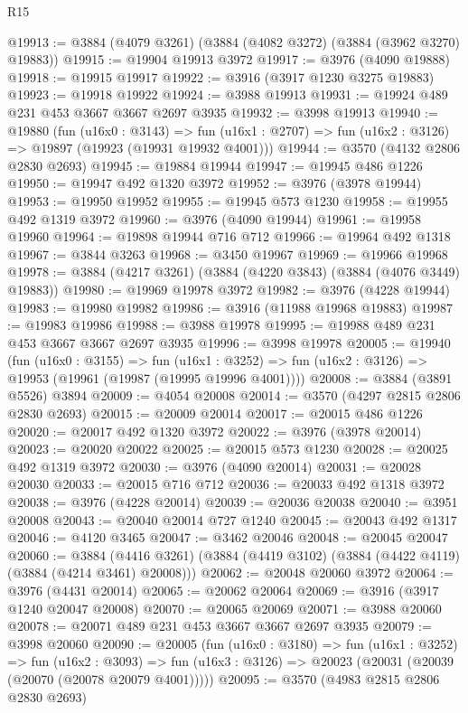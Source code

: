 \begin{lexlean}{R15}
\begin{coremodule}
@19913 := @3884 (@4079 @3261) (@3884 (@4082 @3272) (@3884 (@3962 @3270) @19883))
@19915 := @19904 @19913 @3972
@19917 := @3976 (@4090 @19888)
@19918 := @19915 @19917
@19922 := @3916 (@3917 @1230 @3275 @19883)
@19923 := @19918 @19922
@19924 := @3988 @19913
@19931 := @19924 @489 @231 @453 @3667 @3667 @2697 @3935
@19932 := @3998 @19913
@19940 := @19880
    (fun (u16x0 : @3143) =>
    fun (u16x1 : @2707) => fun (u16x2 : @3126) => @19897 (@19923 (@19931 @19932 @4001)))
@19944 := @3570 (@4132 @2806 @2830 @2693)
@19945 := @19884 @19944
@19947 := @19945 @486 @1226
@19950 := @19947 @492 @1320 @3972
@19952 := @3976 (@3978 @19944)
@19953 := @19950 @19952
@19955 := @19945 @573 @1230
@19958 := @19955 @492 @1319 @3972
@19960 := @3976 (@4090 @19944)
@19961 := @19958 @19960
@19964 := @19898 @19944 @716 @712
@19966 := @19964 @492 @1318
@19967 := @3844 @3263
@19968 := @3450 @19967
@19969 := @19966 @19968
@19978 := @3884 (@4217 @3261) (@3884 (@4220 @3843) (@3884 (@4076 @3449) @19883))
@19980 := @19969 @19978 @3972
@19982 := @3976 (@4228 @19944)
@19983 := @19980 @19982
@19986 := @3916 (@11988 @19968 @19883)
@19987 := @19983 @19986
@19988 := @3988 @19978
@19995 := @19988 @489 @231 @453 @3667 @3667 @2697 @3935
@19996 := @3998 @19978
@20005 := @19940
    (fun (u16x0 : @3155) =>
    fun (u16x1 : @3252) => fun (u16x2 : @3126) => @19953 (@19961 (@19987 (@19995 @19996 @4001))))
@20008 := @3884 (@3891 @5526) @3894
@20009 := @4054 @20008
@20014 := @3570 (@4297 @2815 @2806 @2830 @2693)
@20015 := @20009 @20014
@20017 := @20015 @486 @1226
@20020 := @20017 @492 @1320 @3972
@20022 := @3976 (@3978 @20014)
@20023 := @20020 @20022
@20025 := @20015 @573 @1230
@20028 := @20025 @492 @1319 @3972
@20030 := @3976 (@4090 @20014)
@20031 := @20028 @20030
@20033 := @20015 @716 @712
@20036 := @20033 @492 @1318 @3972
@20038 := @3976 (@4228 @20014)
@20039 := @20036 @20038
@20040 := @3951 @20008
@20043 := @20040 @20014 @727 @1240
@20045 := @20043 @492 @1317
@20046 := @4120 @3465
@20047 := @3462 @20046
@20048 := @20045 @20047
@20060 := @3884
    (@4416 @3261)
    (@3884 (@4419 @3102) (@3884 (@4422 @4119) (@3884 (@4214 @3461) @20008)))
@20062 := @20048 @20060 @3972
@20064 := @3976 (@4431 @20014)
@20065 := @20062 @20064
@20069 := @3916 (@3917 @1240 @20047 @20008)
@20070 := @20065 @20069
@20071 := @3988 @20060
@20078 := @20071 @489 @231 @453 @3667 @3667 @2697 @3935
@20079 := @3998 @20060
@20090 := @20005
    (fun (u16x0 : @3180) =>
    fun (u16x1 : @3252) =>
    fun (u16x2 : @3093) =>
    fun (u16x3 : @3126) => @20023 (@20031 (@20039 (@20070 (@20078 @20079 @4001)))))
@20095 := @3570 (@4983 @2815 @2806 @2830 @2693)

\end{coremodule}
\end{lexlean}
